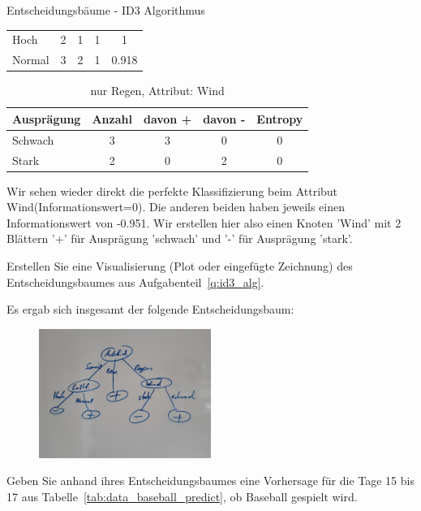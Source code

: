 \begin{task}[credit=16]{Entscheidungsbäume - ID3 Algorithmus}
\begin{subtask}[points=10,title=ID3 Algorithmus]
\begin{solution}
\begin{table}[H]
\begin{tabular}{l|c|c|c|c}
		\midrule
		Hoch&2&1&1&1\\
		Normal&3&2&1&0.918\\
		\bottomrule
	\end{tabular}
\end{table}
\begin{table}[H]
	\centering
	\caption{nur Regen, Attribut: Wind}
	\begin{tabular}{l|c|c|c|c}
		\toprule
		\textbf{Ausprägung} & \textbf{Anzahl} & \textbf{davon +}  & \textbf{davon -} &\textbf{Entropy} \\
		\midrule
		Schwach&3&3&0&0\\
		Stark&2&0&2&0\\
		\bottomrule
	\end{tabular}
\end{table}
Wir sehen wieder direkt die perfekte Klassifizierung beim Attribut Wind(Informationswert=0). Die anderen beiden haben jeweils einen Informationswert von -0.951. Wir erstellen hier also einen Knoten 'Wind' mit 2 Blättern '+' für Ausprägung 'schwach' und '-' für Ausprägung 'stark'.
\end{solution}

\end{subtask}

\begin{subtask}[points=3,title=Visualisierung]
Erstellen Sie eine Visualisierung (Plot oder eingefügte Zeichnung) des Entscheidungsbaumes aus Aufgabenteil~\ref{q:id3_alg}.

\begin{solution}
Es ergab sich insgesamt der folgende Entscheidungsbaum:
\begin{figure}[H]
	\includegraphics[width=0.5\textwidth]{1a.jpg}
\end{figure}
\end{solution}

\end{subtask}

\begin{subtask}[points=3,title=Vorhersage]
Geben Sie anhand ihres Entscheidungsbaumes eine Vorhersage für die Tage 15 bis 17 aus Tabelle~\ref{tab:data_baseball_predict}, ob Baseball gespielt wird.


\end{subtask}
\end{task}
